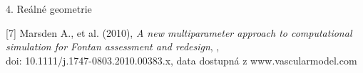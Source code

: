 \documentclass[aspectratio=169,xcolor=dvipsnames]{beamer}
\begin{document}
\begin{frame}[plain]{4. Reálné geometrie}
	\addtocounter{framenumber}{-1}
	\vspace{1mm}
	\tiny{{[7] Marsden A., et al. (2010)}, \textit{A new multiparameter approach to computational simulation for Fontan assessment and redesign}, ,\\doi: 10.1111/j.1747-0803.2010.00383.x, data dostupná z www.vascularmodel.com}
\end{frame}
%

\end{document}
